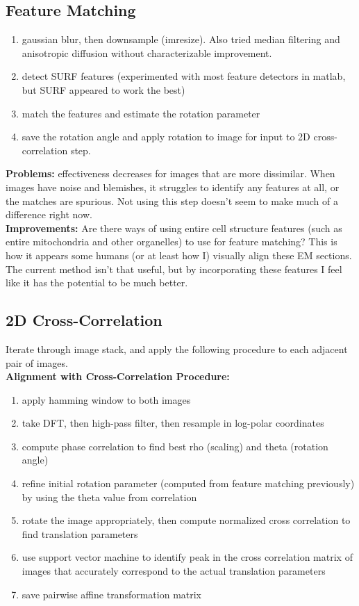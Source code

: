 \documentclass{article}
\begin{document}
\subsection{Feature Matching}
\begin{enumerate}
\item gaussian blur, then downsample (imresize). Also tried median filtering and anisotropic diffusion without characterizable improvement.
\item detect SURF features (experimented with most feature detectors in matlab, but SURF appeared to work the best)
\item match the features and estimate the rotation parameter
\item save the rotation angle and apply rotation to image for input to 2D cross-correlation step.
\end{enumerate}
\textbf{Problems:} effectiveness decreases for images that are more dissimilar. When images have noise and blemishes, it struggles to identify any features at all, or the matches are spurious. Not using this step doesn't seem to make much of a difference right now. \\
\textbf{Improvements:} Are there ways of using entire cell structure features (such as entire mitochondria and other organelles) to use for feature matching? This is how it appears some humans (or at least how I) visually align these EM sections. The current method isn't that useful, but by incorporating these features I feel like it has the potential to be much better.

\subsection{2D Cross-Correlation}
Iterate through image stack, and apply the following procedure to each adjacent pair of images. \\
\textbf{Alignment with Cross-Correlation Procedure:}
\begin{enumerate}
\item apply hamming window to both images
\item take DFT, then high-pass filter, then resample in log-polar coordinates
\item compute phase correlation to find best rho (scaling) and theta (rotation angle)
\item refine initial rotation parameter (computed from feature matching previously) by using the theta value from correlation
\item rotate the image appropriately, then compute normalized cross correlation to find translation parameters
\item use support vector machine to identify peak in the cross correlation matrix of images that accurately correspond to the actual translation parameters
\item save pairwise affine transformation matrix
\end{enumerate}
\end{document}
